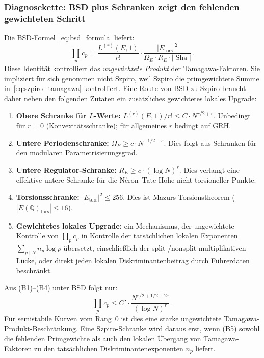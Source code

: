 \documentclass[aps,prd,twocolumn,superscriptaddress,nofootinbib,floatfix]{revtex4-2}
\theoremstyle{definition}
\theoremstyle{remark}
\DeclareMathOperator{\Sha}{Sha}
\begin{document}
\subsubsection{Diagnosekette: BSD plus Schranken zeigt den fehlenden gewichteten Schritt}

Die BSD-Formel~\eqref{eq:bsd_formula} liefert:
\begin{equation}
\prod_p c_p = \frac{L^{(r)}(E,1)}{r!}\cdot
\frac{|E_{\mathrm{tors}}|^2}{\Omega_E\cdot R_E\cdot |\Sha|}\,.
\label{eq:tamagawa_from_bsd}
\end{equation}
Diese Identität kontrolliert das \emph{ungewichtete Produkt} der Tamagawa-Faktoren. Sie impliziert für sich genommen nicht Szpiro, weil Szpiro die primgewichtete Summe in~\eqref{eq:szpiro_tamagawa} kontrolliert. Eine Route von BSD zu Szpiro braucht daher neben den folgenden Zutaten ein zusätzliches gewichtetes lokales Upgrade:
\begin{enumerate}
\item[\textbf{(B1)}] \textbf{Obere Schranke für $L$-Werte:} $L^{(r)}(E,1)/r! \leq C\cdot N^{r/2+\varepsilon}$. Unbedingt für $r=0$ (Konvexitätsschranke); für allgemeines $r$ bedingt auf GRH.
\item[\textbf{(B2)}] \textbf{Untere Periodenschranke:} $\Omega_E \geq c\cdot N^{-1/2-\varepsilon}$. Dies folgt aus Schranken für den modularen Parametrisierungsgrad.
\item[\textbf{(B3)}] \textbf{Untere Regulator-Schranke:} $R_E \geq c\cdot(\log N)^r$. Dies verlangt eine effektive untere Schranke für die Néron--Tate-Höhe nicht-torsioneller Punkte.
\item[\textbf{(B4)}] \textbf{Torsionsschranke:} $|E_{\mathrm{tors}}|^2\leq 256$. Dies ist Mazurs Torsionstheorem ($|E(\mathbb{Q})_{\mathrm{tors}}|\leq 16$).
\item[\textbf{(B5)}] \textbf{Gewichtetes lokales Upgrade:} ein Mechanismus, der ungewichtete Kontrolle von $\prod_p c_p$ in Kontrolle der tatsächlichen lokalen Exponenten $\sum_{p\mid N}n_p\log p$ übersetzt, einschließlich der split-/nonsplit-multiplikativen Lücke, oder direkt jeden lokalen Diskriminantenbeitrag durch Führerdaten beschränkt.
\end{enumerate}
Aus (B1)--(B4) unter BSD folgt nur:
\begin{equation}
\prod_p c_p \leq C'\cdot\frac{N^{r/2+1/2+2\varepsilon}}{(\log N)^r}\,.
\label{eq:tamagawa_bound}
\end{equation}
Für semistabile Kurven vom Rang~$0$ ist dies eine starke ungewichtete Tamagawa-Produkt-Beschränkung. Eine Szpiro-Schranke wird daraus erst, wenn (B5) sowohl die fehlenden Primgewichte als auch den lokalen Übergang von Tamagawa-Faktoren zu den tatsächlichen Diskriminantenexponenten $n_p$ liefert.
\end{document}
